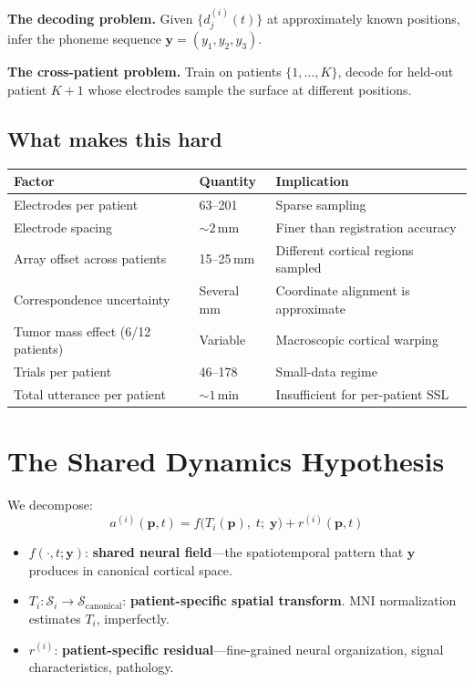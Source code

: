 \documentclass[11pt,letterpaper]{article}
\newcommand{\bfp}{\mathbf{p}}
\newcommand{\bfy}{\mathbf{y}}
\newcommand{\cS}{\mathcal{S}}
\begin{document}
\textbf{The decoding problem.} Given $\{d_j^{(i)}(t)\}$ at approximately known positions, infer the phoneme sequence $\bfy = (y_1, y_2, y_3)$.

\textbf{The cross-patient problem.} Train on patients $\{1, \ldots, K\}$, decode for held-out patient $K{+}1$ whose electrodes sample the surface at different positions.

\subsection{What makes this hard}

\begin{table}[ht]\centering\small
\begin{tabular}{@{}lll@{}}
\toprule
\textbf{Factor} & \textbf{Quantity} & \textbf{Implication} \\
\midrule
Electrodes per patient & 63--201 & Sparse sampling \\
Electrode spacing & ${\sim}2$\,mm & Finer than registration accuracy \\
Array offset across patients & 15--25\,mm & Different cortical regions sampled \\
Correspondence uncertainty & Several mm & Coordinate alignment is approximate \\
Tumor mass effect (6/12 patients) & Variable & Macroscopic cortical warping \\
Trials per patient & 46--178 & Small-data regime \\
Total utterance per patient & ${\sim}1$\,min & Insufficient for per-patient SSL \\
\bottomrule
\end{tabular}
\end{table}


\section{The Shared Dynamics Hypothesis}

We decompose:
\begin{equation}\label{eq:decomposition}
\boxed{a^{(i)}(\bfp, t) = f\bigl(T_i(\bfp),\; t;\; \bfy\bigr) + r^{(i)}(\bfp, t)}
\end{equation}
\begin{itemize}[leftmargin=2em]
\item $f(\cdot, t; \bfy)$: \textbf{shared neural field}---the spatiotemporal pattern that $\bfy$ produces in canonical cortical space.
\item $T_i: \cS_i \to \cS_{\text{canonical}}$: \textbf{patient-specific spatial transform}. MNI normalization estimates $T_i$, imperfectly.
\item $r^{(i)}$: \textbf{patient-specific residual}---fine-grained neural organization, signal characteristics, pathology.
\end{itemize}
\end{document}
